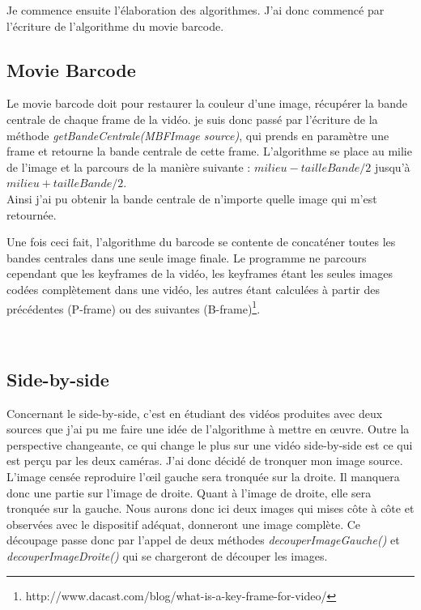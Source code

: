 \documentclass[10pt,a4paper]{article}
\begin{document}
Je commence ensuite l'élaboration des algorithmes. J'ai donc commencé par l'écriture de l'algorithme du movie barcode.
\subsection{Movie Barcode}

Le movie barcode doit pour restaurer la couleur d'une image, récupérer la bande centrale de chaque frame de la vidéo. je suis donc passé par l'écriture de la méthode \textit{getBandeCentrale(MBFImage source)},
qui prends en paramètre une frame et retourne la bande centrale de cette frame. L'algorithme se place au milie de l'image et la parcours de la manière suivante : $milieu - tailleBande /2$ jusqu'à
$milieu + tailleBande /2$.\\
Ainsi j'ai pu obtenir la bande centrale de n'importe quelle image qui m'est retournée.

Une fois ceci fait, l'algorithme du barcode se contente de concaténer toutes les bandes centrales dans une seule image finale. Le programme ne parcours cependant que les keyframes de la vidéo,
les keyframes étant les seules images codées complètement dans une vidéo, les autres étant calculées à partir des précédentes
(P-frame) ou des suivantes (B-frame)\footnote{http://www.dacast.com/blog/what-is-a-key-frame-for-video/}.


~~\\




\subsection{Side-by-side}

Concernant le side-by-side, c'est en étudiant des vidéos produites avec deux sources que j'ai pu me faire une idée de l'algorithme à mettre en œuvre. Outre la perspective changeante,
ce qui change le plus sur une vidéo side-by-side est ce qui est perçu par les deux caméras. J'ai donc décidé de tronquer mon image source. L'image censée reproduire l'œil gauche sera tronquée sur la droite.
Il manquera donc une partie sur l'image de droite. Quant à l'image de droite, elle sera tronquée sur la gauche.  Nous aurons donc ici deux images qui mises côte à côte et observées avec le dispositif adéquat,
donneront une image complète.
Ce découpage passe donc par l'appel de deux méthodes \textit{decouperImageGauche()} et \textit{decouperImageDroite()} qui se chargeront de découper les images.
\end{document}

